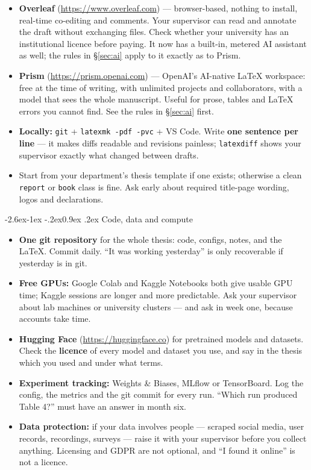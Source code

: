 \documentclass[11pt,a4paper]{article}
\makeatletter
\renewcommand\subsection{\@startsection{subsection}{2}{\z@}%
  {-2.6ex\@plus -1ex \@minus -.2ex}{0.9ex \@plus .2ex}%
  {\normalfont\large\bfseries\color{brandlight}}}
\newcommand{\code}[1]{\texttt{\small #1}}
\makeatother
\begin{document}
\begin{itemize}
  \item \textbf{Overleaf} (\url{https://www.overleaf.com}) --- browser-based,
        nothing to install, real-time co-editing and comments. Your supervisor
        can read and annotate the draft without exchanging files. Check whether
        your university has an institutional licence before paying. It now has
        a built-in, metered AI assistant as well; the rules in \S\ref{sec:ai}
        apply to it exactly as to Prism.
  \item \textbf{Prism} (\url{https://prism.openai.com}) --- OpenAI's
        AI-native LaTeX workspace: free at the time of writing, with unlimited
        projects and collaborators,
        with a model that sees the whole manuscript. Useful for prose,
        tables and LaTeX errors you cannot find. See the rules in
        \S\ref{sec:ai} first.
  \item \textbf{Locally:} \code{git} + \code{latexmk -pdf -pvc} + VS Code.
        Write \textbf{one sentence per line} --- it makes diffs readable and
        revisions painless; \code{latexdiff} shows your supervisor exactly
        what changed between drafts.
  \item Start from your department's thesis template if one exists; otherwise
        a clean \code{report} or \code{book} class is fine. Ask early about
        required title-page wording, logos and declarations.
\end{itemize}

\subsection{Code, data and compute}

\begin{itemize}
  \item \textbf{One git repository} for the whole thesis: code, configs,
        notes, and the LaTeX. Commit daily. ``It was working yesterday'' is
        only recoverable if yesterday is in git.
  \item \textbf{Free GPUs:} Google Colab and Kaggle Notebooks both give usable
        GPU time; Kaggle sessions are longer and more predictable. Ask your
        supervisor about lab machines or university clusters --- and ask in
        week one, because accounts take time.
  \item \textbf{Hugging Face} (\url{https://huggingface.co}) for pretrained
        models and datasets. Check the \textbf{licence} of every model and
        dataset you use, and say in the thesis which you used and under what
        terms.
  \item \textbf{Experiment tracking:} Weights \& Biases, MLflow or
        TensorBoard. Log the config, the metrics and the git commit for every
        run. ``Which run produced Table 4?'' must have an answer in month six.
  \item \textbf{Data protection:} if your data involves people --- scraped
        social media, user records, recordings, surveys --- raise it with your
        supervisor before you collect anything. Licensing and GDPR are not
        optional, and ``I found it online'' is not a licence.
\end{itemize}
\end{document}
